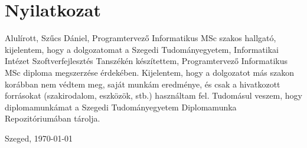 \chapter*{Nyilatkozat}
\vspace{2 cm}

Alulírott, Szűcs Dániel, Programtervező Informatikus MSc szakos hallgató, kijelentem, hogy a dolgozatomat a Szegedi
Tudományegyetem, Informatikai Intézet Szoftverfejlesztés Tanszékén készítettem, Programtervező Informatikus MSc diploma
megszerzése érdekében. Kijelentem, hogy a dolgozatot más szakon korábban nem védtem meg, saját munkám eredménye, és
csak a hivatkozott forrásokat (szakirodalom, eszközök, stb.) használtam fel. Tudomásul veszem, hogy diplomamunkámat a
Szegedi Tudományegyetem Diplomamunka Repozitóriumában tárolja.

\begin{flushleft}
    \vspace*{1cm}
    Szeged, \today
\end{flushleft}

\begin{flushright}
    \vspace*{1cm}
\end{flushright}

\pagebreak
